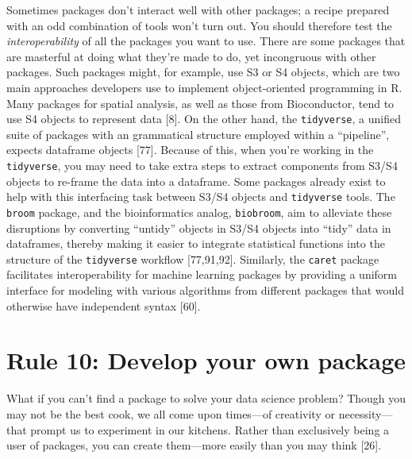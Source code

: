 \documentclass[10pt,letterpaper]{article}
\begin{document}
Sometimes packages don't interact well with other packages; a recipe
prepared with an odd combination of tools won't turn out. You should
therefore test the \emph{interoperability} of all the packages you want
to use. There are some packages that are masterful at doing what they're
made to do, yet incongruous with other packages. Such packages might,
for example, use S3 or S4 objects, which are two main approaches
developers use to implement object-oriented programming in R. Many
packages for spatial analysis, as well as those from Bioconductor, tend
to use S4 objects to represent data {[}8{]}. On the other hand, the
\texttt{tidyverse}, a unified suite of packages with an grammatical
structure employed within a ``pipeline'', expects dataframe objects
{[}77{]}. Because of this, when you're working in the
\texttt{tidyverse}, you may need to take extra steps to extract
components from S3/S4 objects to re-frame the data into a dataframe.
Some packages already exist to help with this interfacing task between
S3/S4 objects and \texttt{tidyverse} tools. The \texttt{broom} package,
and the bioinformatics analog, \texttt{biobroom}, aim to alleviate these
disruptions by converting ``untidy'' objects in S3/S4 objects into
``tidy'' data in dataframes, thereby making it easier to integrate
statistical functions into the structure of the \texttt{tidyverse}
workflow {[}77,91,92{]}. Similarly, the \texttt{caret} package
facilitates interoperability for machine learning packages by providing
a uniform interface for modeling with various algorithms from different
packages that would otherwise have independent syntax {[}60{]}.

\hypertarget{rule-10-develop-your-own-package}{%
\section{Rule 10: Develop your own
package}\label{rule-10-develop-your-own-package}}

What if you can't find a package to solve your data science problem?
Though you may not be the best cook, we all come upon times---of
creativity or necessity---that prompt us to experiment in our kitchens.
Rather than exclusively being a user of packages, you can create
them---more easily than you may think {[}26{]}.
\end{document}
